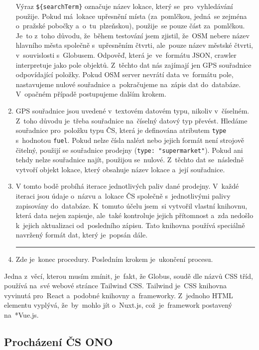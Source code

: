 \begin{enumerate}
        Výraz \texttt{\$\{searchTerm\}} označuje název lokace, který
        se~pro~vyhledávání použije. Pokud má~lokace upřesnění místa
        (za~pomlčkou, jedná~se zejména o~pražské pobočky a~o~tu~plzeňskou),
        použije~se pouze část za~pomlčkou. Je~to z~toho důvodu, že~během
        testování jsem zjistil, že~OSM nebere název hlavního města společně
        s~upřesněním čtvrti, ale~pouze název městské čtvrti, v~souvislosti
        s~Globusem. Odpověď, která je~ve~formátu JSON, crawler interpretuje
        jako pole objektů. Z~těchto dat nás zajímají jen GPS souřadnice
        odpovídající položky. Pokud OSM server nevrátí data ve~formátu pole,
        nastavujeme nulové souřadnice a~pokračujeme na~zápis dat do~databáze.
        V~opačném případě postupujeme dalším krokem.
    \item GPS souřadnice jsou uvedené v~textovém datovém typu, nikoliv
        v~číselném. Z~toho důvodu je~třeba souřadnice na~číselný datový typ
        převést. Hledáme souřadnice pro~položku typu ČS, která je definována
        atributem \texttt{type} s~hodnotou \texttt{fuel}. Pokud nelze čísla
        nalézt nebo jejich formát není strojově čitelný, použijí se
        souřadnice prodejny (\texttt{type: "supermarket"}). Pokud ani tehdy
        nelze souřadnice najít, použijou se~nulové. Z~těchto dat se~následně
        vytvoří objekt lokace, který obsahuje název lokace a~její souřadnice.
    \item V tomto bodě probíhá iterace jednotlivých paliv dané prodejny.
        V~každé iteraci jsou údaje o~názvu a~lokace ČS společně
        s~jednotlivými palivy zapisovány do~databáze. K~tomuto účelu jsem~si
        vytvořil vlastní knihovnu, která data nejen zapisuje, ale~také
        kontroluje jejich přítomnost a~zda nedošlo k~jejich aktualizaci
        od~posledního zápisu. Tato knihovna používá speciálně navržený formát
        dat, který je~popsán dále.
        \medskip    \hrule
    \item Zde je~konec procedury. Posledním krokem je~ukončení procesu.
\end{enumerate}

Jedna z~věcí, kterou musím zmínit, je~fakt, že Globus, soudě dle názvů CSS
tříd, používá na~své webové stránce Tailwind CSS. Tailwind je~CSS knihovna
vyvinutá pro~React a~podobné knihovny a~frameworky. Z~jednoho HTML elementu
vyplývá, že~by~mohlo jít o~Nuxt.js, což~je~framework postavený na~*Vue.js.

\subsection{Procházení ČS ONO}
\label{sec:crawling-ono}

